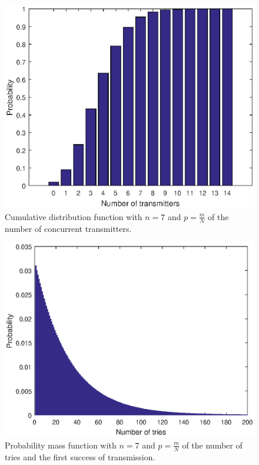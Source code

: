 		\begin{figure}
			\centering
			\includegraphics[width=\textwidth]{chapters/cdf-n=7-p=m_over_N.eps}
			\caption{Cumulative distribution function with $n = 7$ and $p = \frac{m}{N}$  of the number of concurrent transmitters.}
			\label{fig:cdf-n=7}
		\end{figure}

		\begin{figure}
			\centering
			\includegraphics[width=\textwidth]{chapters/pmf-n=7-p=m_over_N_num_of_tries.eps}
			\caption{Probability mass function with $n = 7$ and $p = \frac{m}{N}$ of the number of tries and the first success of transmission.}
			\label{fig:pmf-n=7-num-of-tries}
		\end{figure}

